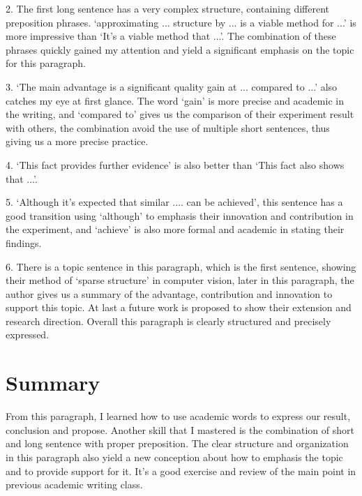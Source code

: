 \documentclass{article}
\begin{document}
2. The first long sentence has a very complex structure, containing different preposition phrases. `approximating ... structure by ... is a viable method for ...' is more impressive than `It's a viable method that ...'. The combination of these phrases quickly gained my attention and yield a significant emphasis on the topic for this paragraph.

3. `The main advantage is a significant quality gain at ... compared to ...' also catches my eye at first glance. The word `gain' is more precise and academic in the writing, and `compared to' gives us the comparison of their experiment result with others, the combination avoid the use of multiple short sentences, thus giving us a more precise practice.

4. `This fact provides further evidence' is also better than `This fact also shows that ...'.

5. `Although it's expected that similar .... can be achieved', this sentence has a good transition using `although' to emphasis their innovation and contribution in the experiment, and `achieve' is also more formal and academic in stating their findings.

6. There is a topic sentence in this paragraph, which is the first sentence, showing their method of `sparse structure' in computer vision, later in this paragraph, the author gives us a summary of the advantage, contribution and innovation to support this topic. At last a future work is proposed to show their extension and research direction. Overall this paragraph is clearly structured and precisely expressed.

\section{Summary}
From this paragraph, I learned how to use academic words to express our result, conclusion and propose. Another skill that I mastered is the combination of short and long sentence with proper preposition. The clear structure and organization in this paragraph also yield a new conception about how to emphasis the topic and to provide support for it. It's a good exercise and review of the main point in previous academic writing class.
\end{document}
